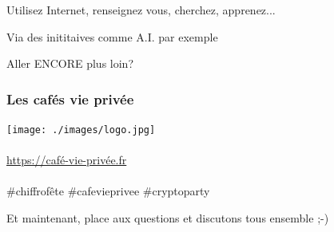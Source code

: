 \documentclass{beamer}
\begin{document}
\begin{frame}
\begin{center}
\Huge{Utilisez Internet, renseignez vous, cherchez, apprenez...}
\end{center}
\end{frame}

\begin{frame}
\begin{center}
\Huge{Via des inititaives comme A.I. par exemple}
\end{center}
\end{frame}

\begin{frame}
\begin{center}
\Huge{Aller ENCORE plus loin?}
\end{center}
\end{frame}

\begin{frame}
\begin{center}
\frametitle{Les cafés vie privée}
\texttt{[image: ./images/logo.jpg]}\\~\\
\url{https://café-vie-privée.fr}
\\~\\
\#chiffrofête \#cafevieprivee \#cryptoparty
\end{center}
\end{frame}

\begin{frame}
\begin{center}
\Huge{Et maintenant, place aux questions et discutons tous ensemble ;-)}
\end{center}
\end{frame}
\end{document}
